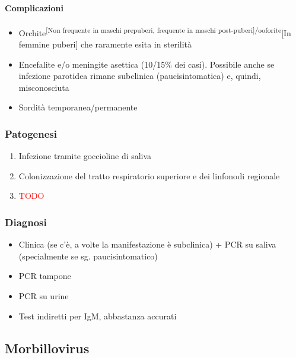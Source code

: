 \documentclass[italian,]{article}
\providecommand{\tightlist}{%
  \setlength{\itemsep}{0pt}\setlength{\parskip}{0pt}}
\newcommand{\TODO}[1]{\textcolor{red}{\textsf{\footnotesize{TODO #1}}}} %
\begin{document}
\hypertarget{complicazioni}{%
\paragraph{Complicazioni}\label{complicazioni}}

\begin{itemize}
\tightlist
\item
  Orchite\textsuperscript{{[}Non frequente in maschi prepuberi,
  frequente in maschi post-puberi{]}/ooforite}{[}In femmine puberi{]}
  che raramente esita in sterilità
\item
  Encefalite e/o meningite asettica (10/15\% dei casi). Possibile anche
  se infezione parotidea rimane subclinica (paucisintomatica) e, quindi,
  misconosciuta
\item
  Sordità temporanea/permanente
\end{itemize}

\hypertarget{patogenesi-9}{%
\subsubsection{Patogenesi}\label{patogenesi-9}}

\begin{enumerate}
\def\labelenumi{\arabic{enumi}.}
\setcounter{enumi}{-1}
\item
  Infezione tramite goccioline di saliva
\item
  Colonizzazione del tratto respiratorio superiore e dei linfonodi
  regionale
\item
  \TODO{}
\end{enumerate}

\hypertarget{diagnosi-11}{%
\subsubsection{Diagnosi}\label{diagnosi-11}}

\begin{itemize}
\tightlist
\item
  Clinica (se c'è, a volte la manifestazione è subclinica) + PCR su
  saliva (specialmente se sg. paucisintomatico)
\item
  PCR tampone
\item
  PCR su urine
\item
  Test indiretti per IgM, abbastanza accurati
\end{itemize}

\hypertarget{morbillovirus}{%
\subsection{Morbillovirus}\label{morbillovirus}}
\end{document}
